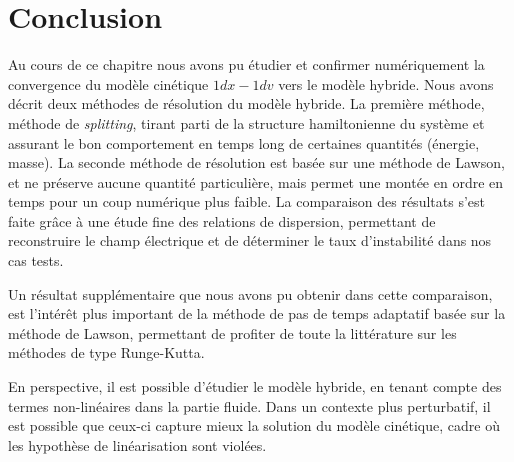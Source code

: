 
\section{Conclusion}

Au cours de ce chapitre nous avons pu étudier et confirmer numériquement la convergence du modèle cinétique $1dx-1dv$ vers le modèle hybride. Nous avons décrit deux méthodes de résolution du modèle hybride. La première méthode, méthode de \emph{splitting}, tirant parti de la structure hamiltonienne du système et assurant le bon comportement en temps long de certaines quantités (énergie, masse). La seconde méthode de résolution est basée sur une méthode de Lawson, et ne préserve aucune quantité particulière, mais permet une montée en ordre en temps pour un coup numérique plus faible. La comparaison des résultats s'est faite grâce à une étude fine des relations de dispersion, permettant de reconstruire le champ électrique et de déterminer le taux d'instabilité dans nos cas tests.

Un résultat supplémentaire que nous avons pu obtenir dans cette comparaison, est l'intérêt plus important de la méthode de pas de temps adaptatif basée sur la méthode de Lawson, permettant de profiter de toute la littérature sur les méthodes de type Runge-Kutta.

En perspective, il est possible d'étudier le modèle hybride, en tenant compte des termes non-linéaires dans la partie fluide. Dans un contexte plus perturbatif, il est possible que ceux-ci capture mieux la solution du modèle cinétique, cadre où les hypothèse de linéarisation sont violées. 

